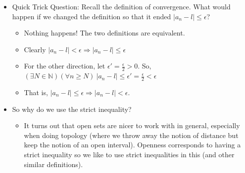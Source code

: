 \documentclass{article}
\begin{document}
\begin{itemize}
\begin{itemize}
        \item We know that $x_n \le y_n \le z_n$. Letting $N = \max(N_1,N_2)$, we have
        \[
        (\exists N \in \mathbb{N})(\forall n \ge N) \ l - \epsilon < x_n \le y_n \le z_n < l + \epsilon
        \]
        \item Hence, $(\forall n \ge N) \ l - \epsilon < y_n < l + \epsilon$.
        \item We conclude $(\forall \epsilon > 0)(\exists N \in \mathbb{N})(\forall n \ge N) \ \vert y_n - l \vert < \epsilon \Rightarrow y_n \rightarrow l$
    \end{itemize}
    \item Quick Trick Question: Recall the definition of convergence. What would happen if we changed the definition so that it ended $\vert a_n - l \vert \le \epsilon$?
    \begin{itemize}
        \item Nothing happens! The two definitions are equivalent.
        \item Clearly $\vert a_n - l \vert < \epsilon \Rightarrow \vert a_n - l \vert \le \epsilon$
        \item For the other direction, let $\epsilon' = \frac{\epsilon}{2} > 0$. So, $(\exists N \in \mathbb{N})(\forall n \ge N) \ \vert a_n - l \vert \le \epsilon' = \frac{\epsilon}{2} < \epsilon$
        \item That is, $\vert a_n - l \vert \le \epsilon \Rightarrow \vert a_n - l \vert < \epsilon$.
    \end{itemize}
    \item So why do we use the strict inequality?
    \begin{itemize}
        \item It turns out that open sets are nicer to work with in general, especially when doing topology (where we throw away the notion of distance but keep the notion of an open interval). Openness corresponds to having a strict inequality so we like to use strict inequalities in this (and other similar definitions).
    \end{itemize}
\end{itemize}
\end{document}
